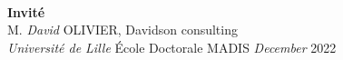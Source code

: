 \begin{center}
    \endminipage
    \vspace{0.6cm}
    \\
    \large
    \textbf{Invité}\\
    \normalsize
    \vspace{.5cm}
    M. \emph{David} OLIVIER, Davidson consulting
    \endminipage
    \vspace{0.8cm}
    \\
    \large
    \emph{Université de Lille}
    \'Ecole Doctorale MADIS
    \endminipage
    \emph{December} 2022
    \endminipage



\end{center}